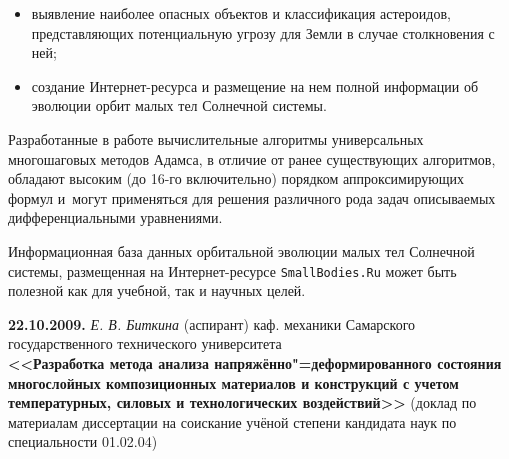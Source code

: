 {\begin{itemize}
\item[--] выявление наиболее опасных объектов и классификация астероидов,
   представляющих потенциальную угрозу для Земли в случае столкновения с ней;
   
\item[--] создание Интернет-ресурса и размещение на нем полной информации
   об эволюции орбит малых тел Солнечной системы.
\end{itemize}   
   
Разработанные в работе вычислительные алгоритмы универсальных многошаговых методов Адамса, 
в отличие от ранее существующих алгоритмов, обладают высоким (до 16-го включительно) порядком  аппроксимирующих формул 
и~могут применяться для решения различного рода задач описываемых дифференциальными уравнениями.

Информационная база данных орбитальной эволюции малых тел Солнечной системы, размещенная на Интернет-ресурсе {\tt SmallBodies.Ru} 
может быть полезной как для учебной, так и научных целей.

}

\bigskip

\noindent
{\bf 22.10.2009.} {\it Е. В. Биткина} {\footnotesize (аспирант) каф. механики Самарского государственного технического университета} \\
{\bf <<Разработка метода анализа напряжённо"=деформированного состояния многослойных композиционных материалов и конструкций с учетом температурных, силовых и технологических воздействий>> } {\footnotesize (доклад по материалам диссертации  на соискание учёной степени кандидата наук по специальности 01.02.04)}

\smallskip

